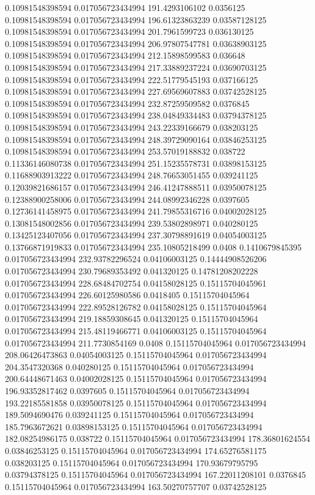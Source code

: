 0.10981548398594 0.017056723434994 191.4293106102 0.0356125
0.10981548398594 0.017056723434994 196.61323863239 0.03587128125
0.10981548398594 0.017056723434994 201.7961599723 0.036130125
0.10981548398594 0.017056723434994 206.97807547781 0.03638903125
0.10981548398594 0.017056723434994 212.15898599583 0.036648
0.10981548398594 0.017056723434994 217.33889237224 0.03690703125
0.10981548398594 0.017056723434994 222.51779545193 0.037166125
0.10981548398594 0.017056723434994 227.69569607883 0.03742528125
0.10981548398594 0.017056723434994 232.87259509582 0.0376845
0.10981548398594 0.017056723434994 238.04849334483 0.03794378125
0.10981548398594 0.017056723434994 243.22339166679 0.038203125
0.10981548398594 0.017056723434994 248.39729090164 0.03846253125
0.10981548398594 0.017056723434994 253.57019188832 0.038722
0.11336146080738 0.017056723434994 251.15235578731 0.03898153125
0.11688903913222 0.017056723434994 248.76653051455 0.039241125
0.12039821686157 0.017056723434994 246.41247888511 0.03950078125
0.12388900258006 0.017056723434994 244.08992346228 0.0397605
0.12736141458975 0.017056723434994 241.79855316716 0.04002028125
0.13081548002856 0.017056723434994 239.53802898971 0.040280125
0.13425123407056 0.017056723434994 237.30798891619 0.04054003125
0.13766871919833 0.017056723434994 235.10805218499 0.0408
0.1410679845395 0.017056723434994 232.93782296524 0.04106003125
0.14444908526206 0.017056723434994 230.79689353492 0.041320125
0.14781208202228 0.017056723434994 228.68484702754 0.04158028125
0.15115704045961 0.017056723434994 226.60125980586 0.0418405
0.15115704045964 0.017056723434994 222.89528126782 0.04158028125
0.15115704045964 0.017056723434994 219.18859308645 0.041320125
0.15115704045964 0.017056723434994 215.48119466771 0.04106003125
0.15115704045964 0.017056723434994 211.7730854169 0.0408
0.15115704045964 0.017056723434994 208.06426473863 0.04054003125
0.15115704045964 0.017056723434994 204.3547320368 0.040280125
0.15115704045964 0.017056723434994 200.64448671463 0.04002028125
0.15115704045964 0.017056723434994 196.93352817462 0.0397605
0.15115704045964 0.017056723434994 193.22185581858 0.03950078125
0.15115704045964 0.017056723434994 189.5094690476 0.039241125
0.15115704045964 0.017056723434994 185.7963672621 0.03898153125
0.15115704045964 0.017056723434994 182.08254986175 0.038722
0.15115704045964 0.017056723434994 178.36801624554 0.03846253125
0.15115704045964 0.017056723434994 174.65276581175 0.038203125
0.15115704045964 0.017056723434994 170.93679795795 0.03794378125
0.15115704045964 0.017056723434994 167.22011208101 0.0376845
0.15115704045964 0.017056723434994 163.50270757707 0.03742528125
